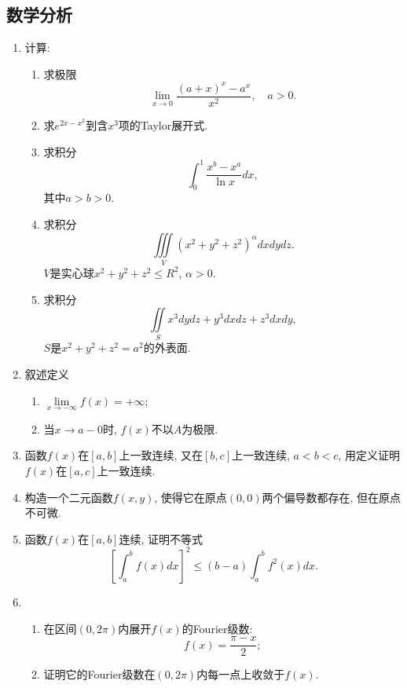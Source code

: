 \documentclass[12pt,a4paper,openany]{book}
\begin{document}
\subsection{数学分析}
\begin{enumerate}
\item 计算:
\begin{enumerate}
\item 求极限
\[
\lim_{x \rightarrow 0}{\frac{(a + x)^x - a^x}{x^2}}, \quad a > 0.
\]

\item 求$e^{2x - x^2}$到含$x^3$项的Taylor展开式.

\item 求积分
\[
\int_{0}^{1}{\frac{x^b - x^a}{\ln{x}}dx},
\]
其中$a > b > 0$.

\item 求积分
\[
\iiint\limits_{V}{(x^2 + y^2 + z^2)^{\alpha}dxdydz}.
\]
$V$是实心球$x^2 + y^2 + z^2 \le R^2$, $\alpha > 0$.

\item 求积分
\[
\iint\limits_{S}{x^3dydz + y^3dxdz + z^3dxdy},
\]
$S$是$x^2 + y^2 + z^2 = a^2$的外表面.
\end{enumerate}

\item 叙述定义
\begin{enumerate}
\item $\lim\limits_{x \rightarrow -\infty}{f(x)} = +\infty$;
\item 当$x \rightarrow a-0$时, $f(x)$不以$A$为极限.
\end{enumerate}

\item 函数$f(x)$在$[a, b]$上一致连续, 又在$[b,c]$上一致连续, $a < b< c$, 用定义证明$f(x)$在$[a, c]$上一致连续.

\item 构造一个二元函数$f(x, y)$, 使得它在原点$(0, 0)$两个偏导数都存在, 但在原点不可微.

\item 函数$f(x)$在$[a, b]$连续, 证明不等式
\[
[\int_{a}^{b}{f(x)dx}]^2 \le (b - a)\int_{a}^{b}{f^2(x)dx}.
\]

\item 
\begin{enumerate}
\item 在区间$(0, 2\pi)$内展开$f(x)$的Fourier级数:
\[
f(x) = \frac{\pi - x}{2};
\]

\item 证明它的Fourier级数在$(0, 2\pi)$内每一点上收敛于$f(x)$.
\end{enumerate}
\end{enumerate}
\end{document}
